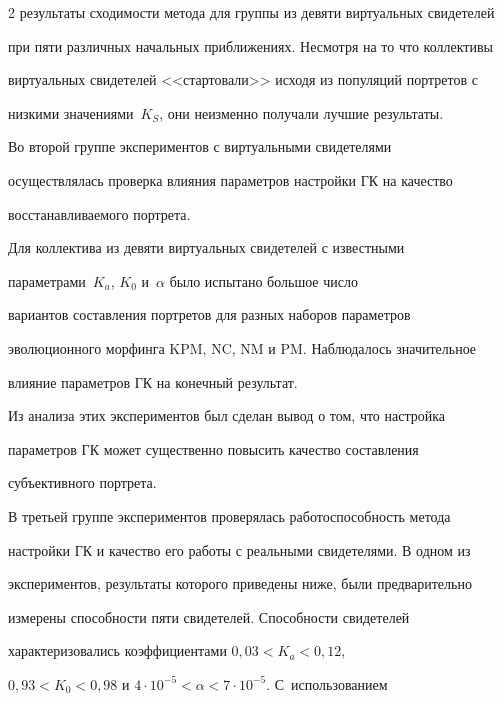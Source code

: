 \begin{multicols}{2}
результаты сходимости метода для группы из девяти виртуальных свидетелей 


при пяти различных начальных приближениях. Несмотря на то что коллективы 


виртуальных свидетелей <<стартовали>> исходя из популяций портретов с 


низкими значениями~$K_S$, они неизменно получали лучшие результаты.


     


     Во второй группе экспериментов с виртуальными свидетелями 


осуществлялась проверка влияния параметров настройки ГК на качество 


восстанавливаемого портрета.





     Для коллектива из девяти виртуальных свидетелей с известными 


параметрами~$K_a$, $K_0$ и~$\alpha$ было испытано большое число 


вариантов составления портретов для разных наборов параметров 


эволюционного морфинга KPM, NC, NM и PM. Наблюдалось значительное 


влияние параметров ГК на конечный результат. 


     


     Из анализа этих экспериментов был сделан вывод о том, что настройка 


параметров ГК может существенно повысить качество составления 


субъективного портрета. 








     В третьей группе экспериментов проверялась работоспособность метода 


настройки ГК и качество его работы с реальными свидетелями. В одном из 


экспериментов, результаты которого приведены ниже, были предварительно 


измерены способности пяти свидетелей. Способности свидетелей 


характеризовались коэффициентами $0{,}03 <K_a < 0{,}12$, 


$0{,}93 <K_0< 0{,}98$ и $4\cdot 10^{-5} <\alpha< 7\cdot 10^{-5}$. С~использованием 



\end{multicols}
